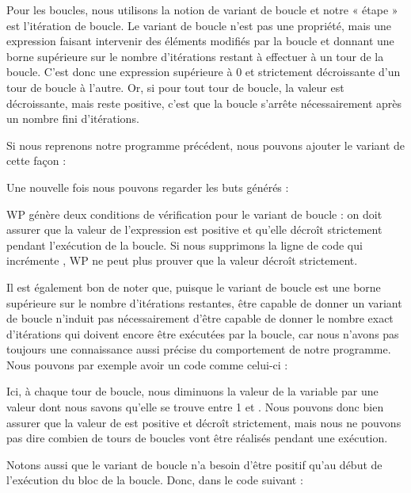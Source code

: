 Pour les boucles, nous utilisons la notion de variant de boucle et notre
« étape » est l'itération de boucle. Le variant de boucle n'est pas une
propriété, mais une expression faisant intervenir des éléments
modifiés par la boucle et donnant une borne supérieure sur le nombre
d'itérations restant à effectuer à un tour de la boucle. C'est donc une
expression supérieure à 0 et strictement décroissante d'un tour de boucle à
l'autre. Or, si pour tout tour de boucle, la valeur est décroissante, mais reste
positive, c'est que la boucle s'arrête nécessairement après un nombre fini
d'itérations.


Si nous reprenons notre programme précédent, nous pouvons ajouter le variant
de cette façon :




Une nouvelle fois nous pouvons regarder les buts générés :




WP génère deux conditions de vérification pour le variant de boucle : on doit
assurer que la valeur de l'expression est positive et qu'elle décroît
strictement pendant l'exécution de la boucle. Si nous supprimons la ligne de
code qui incrémente , WP ne peut plus prouver que la valeur
 décroît strictement.


Il est également bon de noter que, puisque le variant de boucle est une borne
supérieure sur le nombre d'itérations restantes, être capable de donner un
variant de boucle n'induit pas nécessairement d'être capable de donner le nombre
exact d'itérations qui doivent encore être exécutées par la boucle, car nous
n'avons pas toujours une connaissance aussi précise du comportement de notre
programme. Nous pouvons par  exemple avoir un code comme celui-ci :






Ici, à chaque tour de boucle, nous diminuons la valeur de la variable
 par une valeur dont nous savons qu'elle se trouve entre 1 et
. Nous pouvons donc bien assurer que la valeur de 
est positive et décroît strictement, mais nous ne pouvons pas dire combien de
tours de boucles vont être réalisés pendant une exécution.


Notons aussi que le variant de boucle n'a besoin d'être positif qu'au début de
l'exécution du bloc de la boucle. Donc, dans le code suivant :


